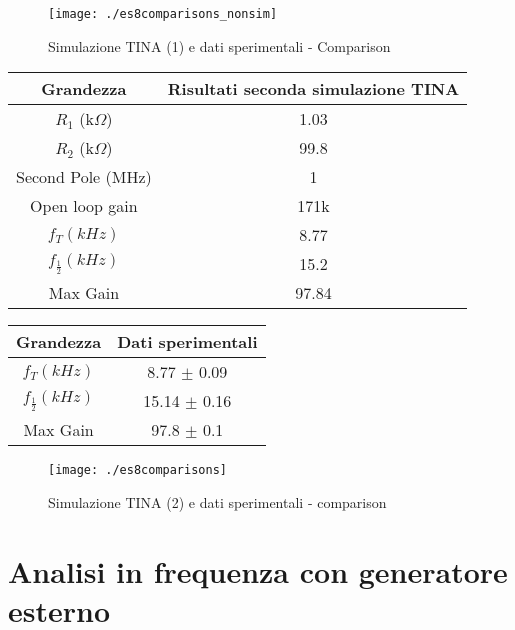 \documentclass{beamer}
\begin{document}
\begin{frame}
\begin{figure}
\centering
\texttt{[image: ./es8comparisons\_nonsim]}
\caption{Simulazione TINA (1) e dati sperimentali - Comparison}
\label{fig:es8comparisons_nonsim}
\end{figure}

\end{frame}

\begin{frame}

{
\centering
\begin{tabular}{|c|c|}
\hline 
Grandezza & Risultati seconda simulazione TINA\\ 
\hline 
$R_1$ (k$\Omega$)& 1.03  \\ 
\hline 
$R_2$ (k$\Omega$) & 99.8 \\ 
\hline 
Second Pole (MHz) & 1 \\ 
\hline
Open loop gain & 171k\\
\hline 
$f_T (kHz)$ & 8.77 \\ 
\hline 
$f_{\frac{1}{2}} (kHz)$ & 15.2 \\ 
\hline 
Max Gain & 97.84 \\ 
\hline 

\end{tabular}


\begin{tabular}{|c|c|}
\hline 
Grandezza & Dati sperimentali \\ 
\hline 
$f_T (kHz)$ & 8.77 $\pm$ 0.09 \\ 
\hline 
$f_{\frac{1}{2}} (kHz)$ & 15.14 $\pm$ 0.16 \\ 
\hline 
Max Gain & 97.8 $\pm$ 0.1 \\ 
\hline 
\end{tabular} 
 
}
\end{frame}

\begin{frame}
\begin{figure}
\centering
\texttt{[image: ./es8comparisons]}
\caption{Simulazione TINA (2) e dati sperimentali - comparison}
\label{fig:es8comparisons}
\end{figure}

\end{frame}

\section{Analisi in frequenza con generatore esterno}
\end{document}
